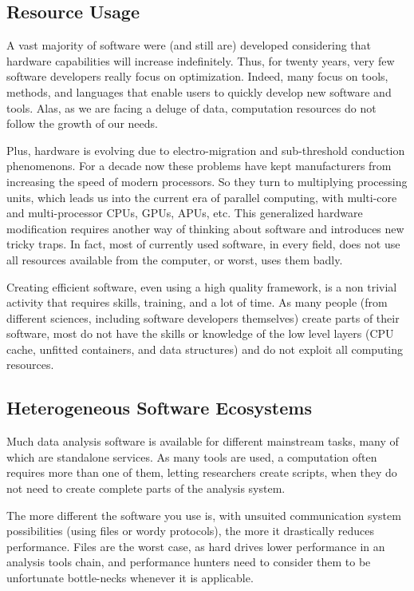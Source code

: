 		\subsection{Resource Usage}
			A vast majority of software were (and still are) developed considering that hardware capabilities will increase indefinitely.
			Thus, for twenty years, very few software developers really focus on optimization.
			Indeed, many focus on tools, methods, and languages that enable users to quickly develop new software and tools.
			Alas, as we are facing a deluge of data, computation resources do not follow the growth of our needs.
			
			Plus, hardware is evolving due to electro-migration and sub-threshold conduction phenomenons.
			For a decade now these problems have kept manufacturers from increasing the speed of modern processors.
			So they turn to multiplying processing units, which leads us into the current era of parallel computing, with multi-core and multi-processor CPUs, GPUs, APUs, etc.
			This generalized hardware modification requires another way of thinking about software and introduces new tricky traps.
			In fact, most of currently used software, in every field, does not use all resources available from the computer, or worst, uses them badly.
			
			Creating efficient software, even using a high quality framework, is a non trivial activity that requires skills, training, and a lot of time.
			As many people (from different sciences, including software developers themselves) create parts of their software, most do not have the skills or knowledge of the low level layers (CPU cache, unfitted containers, and data structures) and do not exploit all computing resources.

		\subsection{Heterogeneous Software Ecosystems}
			Much data analysis software is available for different mainstream tasks, many of which are standalone services.
			As many tools are used, a computation often requires more than one of them, letting researchers create scripts, when they do not need to create complete parts of the analysis system.
			
			The more different the software you use is, with unsuited communication system possibilities (using files or wordy protocols), the more it drastically reduces performance.
			Files are the worst case, as hard drives lower performance in an analysis tools chain, and performance hunters need to consider them to be unfortunate bottle-necks whenever it is applicable.

